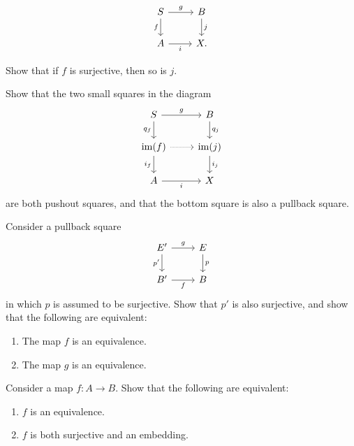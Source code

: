 \begin{exercises}
  \begin{equation*}
    \begin{tikzcd}
      S \arrow[d,swap,"f"] \arrow[r,"g"] & B \arrow[d,"j"] \\
      A \arrow[r,swap,"i"] & X.
    \end{tikzcd}
  \end{equation*}
  \begin{subexenum}
  \item Show that if $f$ is surjective, then so is $j$.
  \item Show that the two small squares in the diagram 
    \begin{equation*}
      \begin{tikzcd}
        S \arrow[r,"g"] \arrow[d,swap,"q_f"] & B \arrow[d,"q_j"] \\
        \im(f) \arrow[r,densely dotted] \arrow[d,swap,"i_f"] & \im(j) \arrow[d,"i_j"] \\
        A \arrow[r,swap,"i"] & X
      \end{tikzcd}
    \end{equation*}
    are both pushout squares, and that the bottom square is also a pullback square.
  \end{subexenum}
  \exercise Consider a pullback square
  \begin{equation*}
    \begin{tikzcd}
      E' \arrow[d,swap,"{p'}"] \arrow[r,"g"] & E \arrow[d,"p"] \\
      B' \arrow[r,swap,"f"] & B
    \end{tikzcd}
  \end{equation*}
  in which $p$ is assumed to be surjective. Show that $p'$ is also surjective, and show that the following are equivalent:
  \begin{enumerate}
  \item The map $f$ is an equivalence.
  \item The map $g$ is an equivalence.
  \end{enumerate}
  \exercise
  Consider a map $f:A\to B$. Show that the following are equivalent:
  \begin{enumerate}
  \item $f$ is an equivalence.
  \item $f$ is both surjective and an embedding.
  \end{enumerate}
\end{exercises}

\endinput

